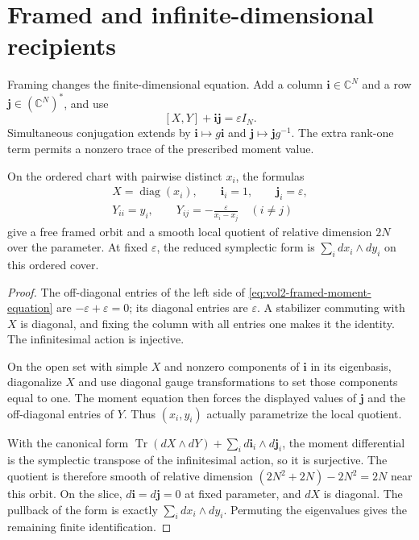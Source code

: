 \section{Framed and infinite-dimensional recipients}
\label{sec:vol2-weyl-action-recipients}

Framing changes the finite-dimensional equation. Add a column
$\mathbf i\in\mathbb C^N$ and a row
$\mathbf j\in(\mathbb C^N)^*$, and use
\begin{equation}\label{eq:vol2-framed-moment-equation}
 [X,Y]+\mathbf i\mathbf j=\varepsilon I_N.
\end{equation}
Simultaneous conjugation extends by
$\mathbf i\mapsto g\mathbf i$ and
$\mathbf j\mapsto\mathbf jg^{-1}$. The extra rank-one
term permits a nonzero trace of the prescribed moment value.

\begin{proposition}\label{prop:vol2-framed-weyl-chart}
On the ordered chart with pairwise distinct $x_i$, the formulas
\begin{equation}\label{eq:vol2-framed-weyl-coordinates}
 \begin{gathered}
 X=\operatorname{diag}(x_i),\qquad
 \mathbf i_i=1,\qquad\mathbf j_i=\varepsilon,\\
 Y_{ii}=y_i,\qquad
 Y_{ij}=-\frac{\varepsilon}{x_i-x_j}\quad(i\ne j)
 \end{gathered}
\end{equation}
give a free framed orbit and a smooth local quotient of
relative dimension $2N$ over the parameter. At fixed
$\varepsilon$, the reduced symplectic form is
$\sum_i dx_i\wedge dy_i$ on this ordered cover.
\end{proposition}
\begin{proof}
The off-diagonal entries of the left side of
\eqref{eq:vol2-framed-moment-equation} are
$-\varepsilon+\varepsilon=0$; its diagonal entries are
$\varepsilon$. A stabilizer commuting with $X$ is diagonal,
and fixing the column with all entries one makes it the
identity. The infinitesimal action is injective.

On the open set with simple $X$ and nonzero components of
$\mathbf i$ in its eigenbasis, diagonalize $X$ and use diagonal
gauge transformations to set those components equal to one.
The moment equation then forces the displayed values of
$\mathbf j$ and the off-diagonal entries of $Y$.
Thus $(x_i,y_i)$ actually parametrize the local quotient.

With the canonical form
$\operatorname{Tr}(dX\wedge dY)
 +\sum_i d\mathbf i_i\wedge d\mathbf j_i$,
the moment differential is the symplectic transpose of the
infinitesimal action, so it is surjective. The quotient is
therefore smooth of relative dimension
$(2N^2+2N)-2N^2=2N$ near this orbit.
On the slice, $d\mathbf i=d\mathbf j=0$ at fixed parameter,
and $dX$ is diagonal. The pullback of the form is exactly
$\sum_i dx_i\wedge dy_i$. Permuting the eigenvalues gives
the remaining finite identification.
\end{proof}

